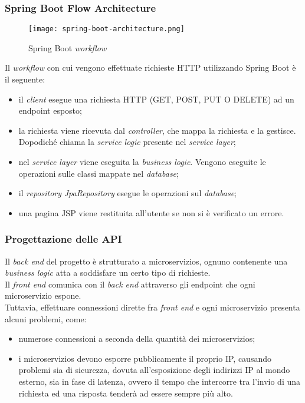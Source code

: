 \subsubsection{Spring Boot Flow Architecture}
\begin{figure}[H]
    \centering
    \texttt{[image: spring-boot-architecture.png]}
    \caption{Spring Boot \textit{workflow}}
\end{figure}
Il \textit{workflow} con cui vengono effettuate richieste HTTP utilizzando
Spring Boot è il seguente:
\begin{itemize}
    \item il \textit{client} esegue una richiesta HTTP (GET, POST, PUT O DELETE) ad un
          \gls{endpoint} esposto;
    \item la richiesta viene ricevuta dal \textit{controller}, che mappa la
          richiesta e la gestisce. Dopodiché chiama la \textit{service logic}
          presente
          nel \textit{service layer};
    \item nel \textit{service layer} viene eseguita la \textit{business logic}.
          Vengono eseguite le operazioni sulle classi mappate nel
          \textit{database};
    \item il \textit{repository} \textit{JpaRepository} esegue le operazioni
          sul \textit{database};
    \item una pagina \gls{JSP} viene restituita all'utente se non si è
          verificato un errore. \cite{site-microservizi}
\end{itemize}

\subsubsection{Progettazione delle API}
Il \textit{back end} del progetto è strutturato a \glspl{microservizio}, ognuno
contenente una \textit{business logic} atta a soddisfare un certo tipo di
richieste.\\
Il \textit{front end} comunica con il \textit{back end} attraverso gli
\gls{endpoint} che ogni \gls{microservizio} espone. \\
Tuttavia, effettuare connessioni dirette fra \textit{front end} e ogni
\gls{microservizio} presenta alcuni problemi, come:
\begin{itemize}
    \item numerose connessioni a seconda della quantità dei
          \glspl{microservizio};
    \item i \glspl{microservizio} devono esporre pubblicamente il proprio
          \gls{IP}, causando problemi sia di sicurezza, dovuta all'esposizione
          degli
          indirizzi \gls{IP} al mondo esterno, sia in fase di latenza, ovvero
          il tempo
          che intercorre tra l'invio di una richiesta ed una risposta tenderà
          ad essere
          sempre più alto. \cite{site-api-gateway}
\end{itemize}

